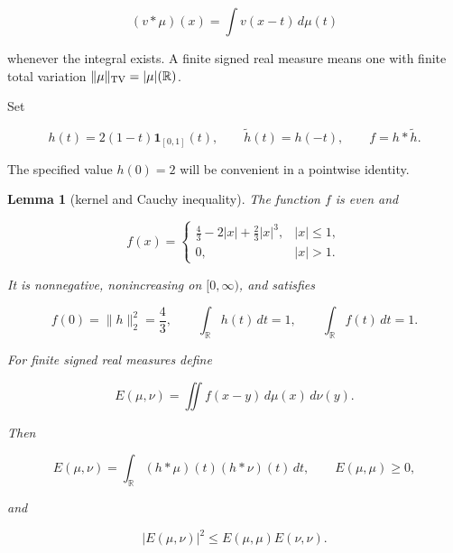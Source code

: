 \documentclass[10pt]{article}
\numberwithin{equation}{section}
\newtheorem{lemma}[theorem]{Lemma}
\theoremstyle{remark}
\begin{document}
\[
(v*\mu)(x)=\int v(x-t)\,d\mu(t)
\]

whenever the integral exists. A finite signed real measure means one with
finite total variation \(\|\mu\|_{\rm TV}=|\mu|(\mathbb R)\).

Set

\begin{equation}
h(t)=2(1-t)\mathbf1_{[0,1]}(t),\qquad
\widetilde h(t)=h(-t),\qquad f=h*\widetilde h.
\label{eq:s2-1}
\end{equation}

The specified value \(h(0)=2\) will be convenient in a pointwise identity.

\begin{lemma}[kernel and Cauchy inequality]\label{lem:2} The function \(f\) is even and

\begin{equation}
f(x)=
\begin{cases}
\displaystyle\frac43-2|x|+\frac23|x|^3,&|x|\le1,\\
0,&|x|>1.
\end{cases}
\label{eq:s2-2}
\end{equation}

It is nonnegative, nonincreasing on \([0,\infty)\), and satisfies

\begin{equation}
f(0)=\|h\|_2^2=\frac43,
\qquad \int_{\mathbb R}h(t)\,dt=1,
\qquad \int_{\mathbb R}f(t)\,dt=1.
\label{eq:s2-3}
\end{equation}

For finite signed real measures define

\[
E(\mu,\nu)=\iint f(x-y)\,d\mu(x)\,d\nu(y).
\]

Then

\begin{equation}
E(\mu,\nu)=\int_{\mathbb R}(h*\mu)(t)(h*\nu)(t)\,dt,
\qquad E(\mu,\mu)\ge0,
\label{eq:s2-4}
\end{equation}

and

\begin{equation}
|E(\mu,\nu)|^2\le E(\mu,\mu)E(\nu,\nu).
\label{eq:s2-5}
\end{equation}

\end{lemma}
\end{document}

